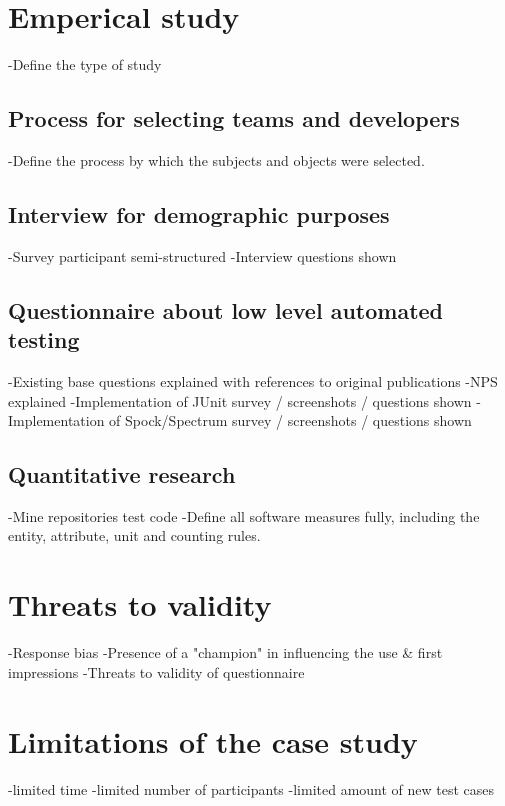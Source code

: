 \section{Emperical study}
-Define the type of study
\subsection{Process for selecting teams and developers}
-Define the process by which the subjects and objects were selected.\newline
\subsection{Interview for demographic purposes}
-Survey participant semi-structured\newline
-Interview questions shown\newline
\subsection{Questionnaire about low level automated testing}
    -Existing base questions explained with references to original publications\newline
    -NPS explained\newline
    -Implementation of JUnit survey / screenshots / questions shown\newline
    -Implementation of Spock/Spectrum survey / screenshots / questions shown\newline\newline
\subsection{Quantitative research}
-Mine repositories test code\newline
    -Define all software measures fully, including the entity, attribute, unit and counting rules.

\section{Threats to validity}
-Response bias\newline
-Presence of a "champion" in influencing the use & first impressions\newline
-Threats to validity of questionnaire\newline\newline
\section{Limitations of the case study}
-limited time\newline
-limited number of participants\newline
-limited amount of new test cases\newline



